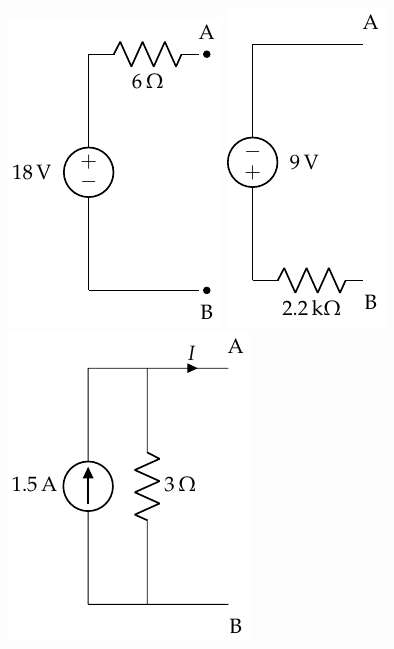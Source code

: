 \documentclass[10pt]{article}
\begin{document}
\includegraphics[scale=0.75]{../figs/Conversion_Fuentes.pdf}
\hspace{1cm}
\includegraphics[scale=0.75]{../figs/Conversion_Fuentes_2.pdf}
\hspace{1cm}
\includegraphics[scale=0.75]{../figs/Conversion_Fuentes_3.pdf}
\end{document}
